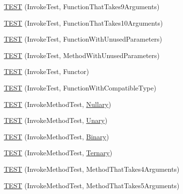 \begin{DoxyCompactItemize}
\item 
\hyperlink{namespacetesting_1_1gmock__more__actions__test_a65d674aacb46d8bf79dbdfe0d49df442}{T\+E\+ST} (Invoke\+Test, Function\+That\+Takes9\+Arguments)
\item 
\hyperlink{namespacetesting_1_1gmock__more__actions__test_a8939ea1ccb0d8787c926c92441b27f6c}{T\+E\+ST} (Invoke\+Test, Function\+That\+Takes10\+Arguments)
\item 
\hyperlink{namespacetesting_1_1gmock__more__actions__test_a0dd6901e637db57c56f1cf8052b6e1bf}{T\+E\+ST} (Invoke\+Test, Function\+With\+Unused\+Parameters)
\item 
\hyperlink{namespacetesting_1_1gmock__more__actions__test_a4f48af38351403b569fc6dfae7787ed2}{T\+E\+ST} (Invoke\+Test, Method\+With\+Unused\+Parameters)
\item 
\hyperlink{namespacetesting_1_1gmock__more__actions__test_ac56a4cb164b338d3f388ed3f4306a5a5}{T\+E\+ST} (Invoke\+Test, Functor)
\item 
\hyperlink{namespacetesting_1_1gmock__more__actions__test_af9dfd7f1d4186ee4de2d9871a19dba5a}{T\+E\+ST} (Invoke\+Test, Function\+With\+Compatible\+Type)
\item 
\hyperlink{namespacetesting_1_1gmock__more__actions__test_abb046fd809977722720c9ce63afd7af5}{T\+E\+ST} (Invoke\+Method\+Test, \hyperlink{namespacetesting_1_1gmock__more__actions__test_acdd2dd80f777fdb770b513b63064ac19}{Nullary})
\item 
\hyperlink{namespacetesting_1_1gmock__more__actions__test_a386ce48f1f0a49e2b94a16deeffc2084}{T\+E\+ST} (Invoke\+Method\+Test, \hyperlink{namespacetesting_1_1gmock__more__actions__test_aad456ea2ee1b0cb2741b676a34f540a3}{Unary})
\item 
\hyperlink{namespacetesting_1_1gmock__more__actions__test_a86221fa7d09853358e38c01b0d6ceced}{T\+E\+ST} (Invoke\+Method\+Test, \hyperlink{namespacetesting_1_1gmock__more__actions__test_a853c9f048674a60798b930750b74a1df}{Binary})
\item 
\hyperlink{namespacetesting_1_1gmock__more__actions__test_a2b98a8a68d37a0bec600227372a1cff8}{T\+E\+ST} (Invoke\+Method\+Test, \hyperlink{namespacetesting_1_1gmock__more__actions__test_ab98b352528a0b72625b4710a6fc648a1}{Ternary})
\item 
\hyperlink{namespacetesting_1_1gmock__more__actions__test_af0ab6ef9fdf48e8442a5579ab27eb517}{T\+E\+ST} (Invoke\+Method\+Test, Method\+That\+Takes4\+Arguments)
\item 
\hyperlink{namespacetesting_1_1gmock__more__actions__test_a512db122c5beadeeef026bb54aec7e45}{T\+E\+ST} (Invoke\+Method\+Test, Method\+That\+Takes5\+Arguments)

\end{DoxyCompactItemize}
